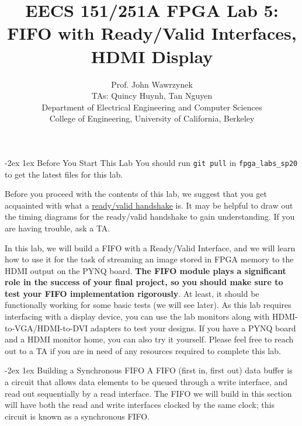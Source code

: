 \documentclass[11pt]{article}
\makeatletter
\renewcommand{\section}
{\@startsection {section}{1}{0pt}
 {-2ex}
 {1ex}
 {\bfseries\Large}}
\makeatother
\begin{document}
\def\PYZsq{\textquotesingle}
\title{\vspace{-0.4in}\Large \bf EECS 151/251A FPGA Lab 5:\\FIFO with Ready/Valid Interfaces, HDMI Display\vspace{-0.1in}}

\author{Prof. John Wawrzynek \\
TAs: Quincy Huynh, Tan Nguyen \\ Department of Electrical Engineering and Computer Sciences\\
College of Engineering, University of California, Berkeley}
\date{}
\maketitle

\section{Before You Start This Lab}
You should run \verb|git pull| in \verb|fpga_labs_sp20| to get the latest files for this lab.

Before you proceed with the contents of this lab, we suggest that you get acquainted with what a \href{http://inst.eecs.berkeley.edu/~eecs151/sp20/files/verilog/ready_valid_interface.pdf}{ready/valid handshake} is. It may be helpful to draw out the timing diagrams for the ready/valid handshake to gain understanding. If you are having trouble, ask a TA. 

In this lab, we will build a FIFO with a Ready/Valid Interface, and we will learn how to use it for the task of streaming an image stored in FPGA memory to the HDMI output on the PYNQ board. \textbf{The FIFO module plays a significant role in the success of your final project, so you should make sure to test your FIFO implementation rigorously}. At least, it should be functionally working for some basic tests (we will see later). As this lab requires interfacing with a display device, you can use the lab monitors along with HDMI-to-VGA/HDMI-to-DVI adapters to test your designs. If you have a PYNQ board and a HDMI monitor home, you can also try it yourself. Please feel free to reach out to a TA if you are in need of any resources required to complete this lab.

\section{Building a Synchronous FIFO}
A FIFO (first in, first out) data buffer is a circuit that allows data elements to be queued through a write interface, and read out sequentially by a read interface.
The FIFO we will build in this section will have both the read and write interfaces clocked by the same clock; this circuit is known as a synchronous FIFO.
\end{document}

